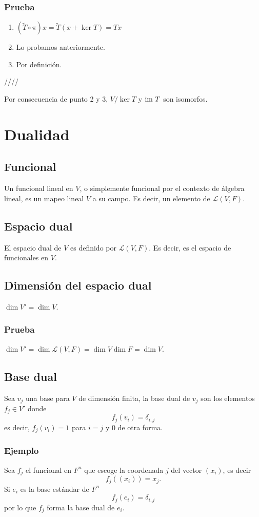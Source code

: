 \documentclass{article}
\begin{document}
\subsubsection*{Prueba}
\begin{enumerate}
    \item $(\widetilde{T}\circ\pi)x = \widetilde{T}(x+\ker T) = Tx$
    \item Lo probamos anteriormente.
    \item Por definición.
\end{enumerate}
\hfill ////

Por consecuencia de punto 2 y 3, $V/\ker T$ y $\text{im } T$ son
isomorfos.
\newpage

\section{Dualidad}
\subsection{Funcional}
Un funcional lineal en $V$, o simplemente funcional por el contexto de 
álgebra lineal, es un mapeo lineal $V$ a su campo.
Es decir, un elemento de $\mathcal{L}(V,F)$.

\subsection{Espacio dual}
El espacio dual de $V$ es definido por $\mathcal{L}(V,F)$.
Es decir, es el espacio de funcionales en $V$.

\subsection{Dimensión del espacio dual}
$\dim V' = \dim V$.
\subsubsection*{Prueba}
$\dim V' = \dim \mathcal{L}(V,F) = \dim V \dim F = \dim V$.

\subsection{Base dual}
Sea $v_j$ una base para $V$ de dimensión finita, la base dual de $v_j$ 
son los elementos $f_j\in V'$ donde 
$$f_j(v_i) = \delta_{i,j}$$
es decir, $f_j(v_i)=1$ para $i=j$ y $0$ de otra forma.

\subsubsection{Ejemplo}
Sea $f_j$ el funcional en $F^n$ que escoge la coordenada $j$
del vector $(x_i)$, es decir
$$f_j((x_i))=x_j.$$
Si $e_i$ es la base estándar de $F^n$
$$f_j(e_i)=\delta_{i,j}$$
por lo que $f_j$ forma la base dual de $e_i$.
\end{document}
